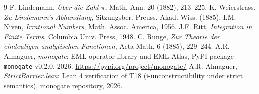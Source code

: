 \documentclass[11pt]{article}
\begin{document}
\begin{thebibliography}{9}
  F. Lindemann, \textit{\"Uber die Zahl $\pi$}, Math. Ann. 20 (1882), 213--225.
  K. Weierstrass, \textit{Zu Lindemann's Abhandlung}, Sitzungsber. Preuss. Akad. Wiss. (1885).
  I.M. Niven, \textit{Irrational Numbers}, Math. Assoc. America, 1956.
  J.F. Ritt, \textit{Integration in Finite Terms}, Columbia Univ. Press, 1948.
  C. Runge, \textit{Zur Theorie der eindeutigen analytischen Functionen},
  Acta Math. 6 (1885), 229--244.
  A.R. Almaguer, \textit{monogate}: EML operator library and EML Atlas,
  PyPI package \texttt{monogate} v0.2.0, 2026.
  \url{https://pypi.org/project/monogate/}
  A.R. Almaguer, \textit{StrictBarrier.lean}: Lean 4 verification of T18
  (i-unconstructibility under strict semantics), monogate repository, 2026.
\end{thebibliography}
\end{document}
